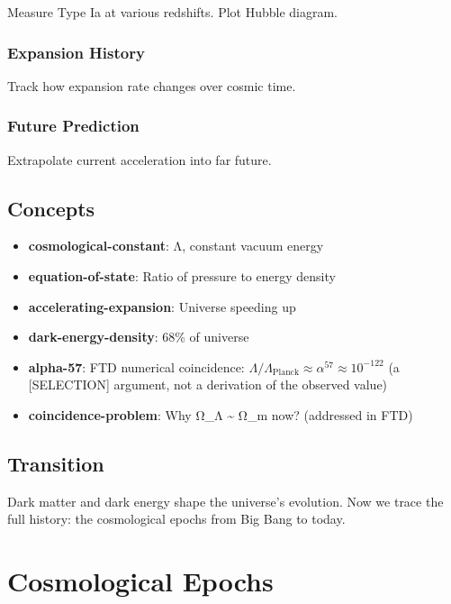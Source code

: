 \documentclass[
  11pt,
  letterpaper,
  twoside,
  openright]{book}
\providecommand{\tightlist}{%
  \setlength{\itemsep}{0pt}\setlength{\parskip}{0pt}}
\begin{document}
Measure Type Ia at various redshifts. Plot Hubble diagram.

\subsection{Expansion History}\label{expansion-history}

Track how expansion rate changes over cosmic time.

\subsection{Future Prediction}\label{future-prediction}

Extrapolate current acceleration into far future.

\section{Concepts}\label{concepts-30}

\begin{itemize}
\tightlist
\item
  \textbf{cosmological-constant}: Λ, constant vacuum energy
\item
  \textbf{equation-of-state}: Ratio of pressure to energy density
\item
  \textbf{accelerating-expansion}: Universe speeding up
\item
  \textbf{dark-energy-density}: 68\% of universe
\item
  \textbf{alpha-57}: FTD numerical coincidence:
  \(\Lambda/\Lambda_{\text{Planck}} \approx \alpha^{57} \approx 10^{-122}\)
  (a {[}SELECTION{]} argument, not a derivation of the observed value)
\item
  \textbf{coincidence-problem}: Why Ω\_Λ \textasciitilde{} Ω\_m now?
  (addressed in FTD)
\end{itemize}

\section{Transition}\label{transition-30}

Dark matter and dark energy shape the universe's evolution. Now we trace
the full history: the cosmological epochs from Big Bang to today.

\chapter{Cosmological Epochs}\label{sec-cosmological-epochs}
\end{document}

